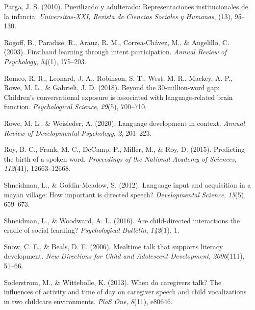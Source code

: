 \documentclass[
  man,floatsintext]{apa6}
\newlength{\cslhangindent}
\newlength{\cslentryspacingunit} %
\newenvironment{CSLReferences}[2] %
 {%
  \setlength{\parindent}{0pt}
  \ifodd #1
  \let\oldpar\par
  \def\par{\hangindent=\cslhangindent\oldpar}
  \fi
  \setlength{\parskip}{#2\cslentryspacingunit}
 }%
 {}
\begin{document}
\begin{CSLReferences}{1}{0}
\leavevmode{}%
Parga, J. S. (2010). Puerilizado y adulterado: Representaciones institucionales de la infancia. \emph{Universitas-XXI, Revista de Ciencias Sociales y Humanas}, (13), 95--130.

\leavevmode{}%
Rogoff, B., Paradise, R., Arauz, R. M., Correa-Chávez, M., \& Angelillo, C. (2003). Firsthand learning through intent participation. \emph{Annual Review of Psychology}, \emph{54}(1), 175--203.

\leavevmode{}%
Romeo, R. R., Leonard, J. A., Robinson, S. T., West, M. R., Mackey, A. P., Rowe, M. L., \& Gabrieli, J. D. (2018). Beyond the 30-million-word gap: Children's conversational exposure is associated with language-related brain function. \emph{Psychological Science}, \emph{29}(5), 700--710.

\leavevmode{}%
Rowe, M. L., \& Weisleder, A. (2020). Language development in context. \emph{Annual Review of Developmental Psychology}, \emph{2}, 201--223.

\leavevmode{}%
Roy, B. C., Frank, M. C., DeCamp, P., Miller, M., \& Roy, D. (2015). Predicting the birth of a spoken word. \emph{Proceedings of the National Academy of Sciences}, \emph{112}(41), 12663--12668.

\leavevmode{}%
Shneidman, L., \& Goldin-Meadow, S. (2012). Language input and acquisition in a mayan village: How important is directed speech? \emph{Developmental Science}, \emph{15}(5), 659--673.

\leavevmode{}%
Shneidman, L., \& Woodward, A. L. (2016). Are child-directed interactions the cradle of social learning? \emph{Psychological Bulletin}, \emph{142}(1), 1.

\leavevmode{}%
Snow, C. E., \& Beals, D. E. (2006). Mealtime talk that supports literacy development. \emph{New Directions for Child and Adolescent Development}, \emph{2006}(111), 51--66.

\leavevmode{}%
Soderstrom, M., \& Wittebolle, K. (2013). When do caregivers talk? The influences of activity and time of day on caregiver speech and child vocalizations in two childcare environments. \emph{PloS One}, \emph{8}(11), e80646.


\end{CSLReferences}
\end{document}
